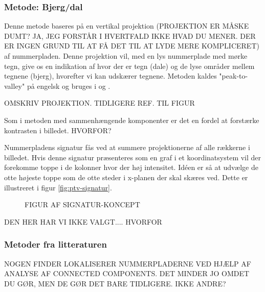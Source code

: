 \subsubsection*{Metode: Bjerg/dal}
Denne metode baseres på en vertikal projektion (PROJEKTION ER MÅSKE DUMT? JA, JEG FORSTÅR I HVERTFALD IKKE HVAD DU MENER. DER ER INGEN GRUND TIL AT FÅ DET TIL AT LYDE MERE KOMPLICERET) af nummerpladen. Denne projektion vil, med en lys nummerplade med mørke tegn, give os en indikation af hvor der er tegn (dale) og de lyse områder mellem tegnene (bjerg), hvorefter vi kan udskærer tegnene. Metoden kaldes "peak-to-valley" på engelsk og bruges i \cite{ron} og \cite{kwas}.

OMSKRIV PROJEKTION. TIDLIGERE REF. TIL FIGUR

Som i metoden med sammenhængende komponenter er det en fordel at forstærke kontrasten i billedet. HVORFOR?

Nummerpladens signatur fås ved at summere projektionerne af alle rækkerne i billedet. Hvis denne signatur præsenteres som en graf i et koordinatsystem vil der forekomme toppe i de kolonner hvor der høj intensitet. Idéen er så at udvælge de otte højeste toppe som de otte steder i x-planen der skal skæres ved. Dette er illustreret i figur \vref{fig:ptv-signatur}.

\begin{figure}[htp]
  \centering
  \caption{FIGUR AF SIGNATUR-KONCEPT}
  \label{fig:ptv-signatur}
\end{figure}

DEN HER HAR VI IKKE VALGT.... HVORFOR

\subsubsection{Metoder fra litteraturen}

NOGEN FINDER LOKALISERER NUMMERPLADERNE VED HJÆLP AF ANALYSE AF CONNECTED COMPONENTS. DET MINDER JO OMDET DU GØR, MEN DE GØR DET BARE TIDLIGERE.
IKKE ANDRE?

